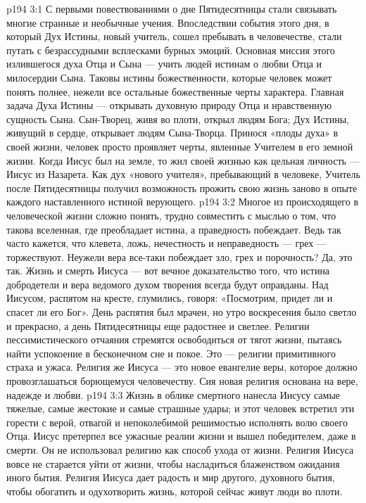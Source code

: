 \vs p194 3:1 С первыми повествованиями о дне Пятидесятницы стали связывать многие странные и необычные учения. Впоследствии события этого дня, в который Дух Истины, новый учитель, сошел пребывать в человечестве, стали путать с безрассудными всплесками бурных эмоций. Основная миссия этого излившегося духа Отца и Сына --- учить людей истинам о любви Отца и милосердии Сына. Таковы истины божественности, которые человек может понять полнее, нежели все остальные божественные черты характера. Главная задача Духа Истины --- открывать духовную природу Отца и нравственную сущность Сына. Сын\hyp{}Творец, живя во плоти, открыл людям Бога; Дух Истины, живущий в сердце, открывает людям Сына\hyp{}Творца. Принося «плоды духа» в своей жизни, человек просто проявляет черты, явленные Учителем в его земной жизни. Когда Иисус был на земле, то жил своей жизнью как цельная личность --- Иисус из Назарета. Как дух «нового учителя», пребывающий в человеке, Учитель после Пятидесятницы получил возможность прожить свою жизнь заново в опыте каждого наставленного истиной верующего.
\vs p194 3:2 Многое из происходящего в человеческой жизни сложно понять, трудно совместить с мыслью о том, что такова вселенная, где преобладает истина, а праведность побеждает. Ведь так часто кажется, что клевета, ложь, нечестность и неправедность --- грех --- торжествуют. Неужели вера все\hyp{}таки побеждает зло, грех и порочность? Да, это так. Жизнь и смерть Иисуса --- вот вечное доказательство того, что истина добродетели и вера ведомого духом творения всегда будут оправданы. Над Иисусом, распятом на кресте, глумились, говоря: «Посмотрим, придет ли и спасет ли его Бог». День распятия был мрачен, но утро воскресения было светло и прекрасно, а день Пятидесятницы еще радостнее и светлее. Религии пессимистического отчаяния стремятся освободиться от тягот жизни, пытаясь найти успокоение в бесконечном сне и покое. Это --- религии примитивного страха и ужаса. Религия же Иисуса --- это новое евангелие веры, которое должно провозглашаться борющемуся человечеству. Сия новая религия основана на вере, надежде и любви.
\vs p194 3:3 Жизнь в облике смертного нанесла Иисусу самые тяжелые, самые жестокие и самые страшные удары; и этот человек встретил эти горести с верой, отвагой и непоколебимой решимостью исполнять волю своего Отца. Иисус претерпел все ужасные реалии жизни и вышел победителем, даже в смерти. Он не использовал религию как способ ухода от жизни. Религия Иисуса вовсе не старается уйти от жизни, чтобы насладиться блаженством ожидания иного бытия. Религия Иисуса дает радость и мир другого, духовного бытия, чтобы обогатить и одухотворить жизнь, которой сейчас живут люди во плоти.
